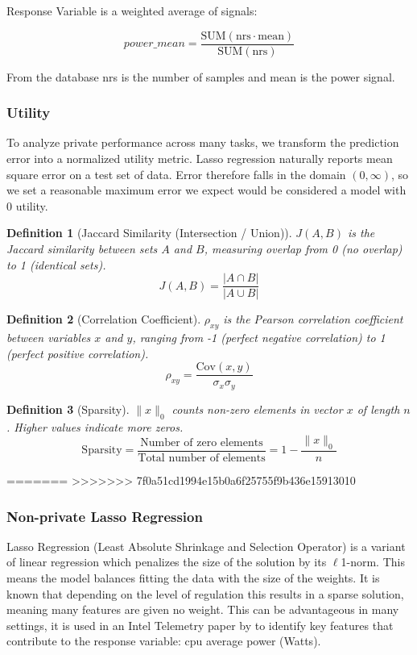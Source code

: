 \documentclass[12pt,letterpaper]{article}
\newtheorem{definition}{Definition}
\begin{document}
Response Variable is a weighted average of signals:

\[power\_mean = \frac{\text{SUM}(\text{nrs} \cdot \text{mean})}{\text{SUM}(\text{nrs})}\]

From the database nrs is the number of samples and mean is the power signal. 

\subsubsection{Utility}

To analyze private performance across many tasks, we transform the prediction error into a normalized utility metric. Lasso regression naturally reports mean square error on a test set of data. Error therefore falls in the domain $(0, \infty)$, so we set a reasonable maximum error we expect would be considered a model with 0 utility. 

\begin{definition}[Jaccard Similarity (Intersection / Union)]
    \label{def:sim}
    $J(A, B)$ is the Jaccard similarity between sets $A$ and $B$, measuring overlap from 0 (no overlap) to 1 (identical sets).
    \[J(A, B) = \frac{|A \cap B|}{|A \cup B|} \]
\end{definition}

\begin{definition}[Correlation Coefficient]
    \label{def:r2}
    $\rho_{xy}$ is the Pearson correlation coefficient between variables $x$ and $y$, ranging from -1 (perfect negative correlation) to 1 (perfect positive correlation).
    \[\rho_{xy} = \frac{\text{Cov}(x,y)}{\sigma_x \sigma_y}\]
\end{definition}

\begin{definition}[Sparsity]
    \label{def:sparsity}
    $\|x\|_0$ counts non-zero elements in vector $x$ of length $n$. Higher values indicate more zeros.
    \[\text{Sparsity} = \frac{\text{Number of zero elements}}{\text{Total number of elements}} = 1 - \frac{\|x\|_0}{n}\]
\end{definition}
=======
>>>>>>> 7f0a51cd1994e15b0a6f25755f9b436e15913010

\subsubsection{Non-private Lasso Regression}

Lasso Regression (Least Absolute Shrinkage and Selection Operator) is a variant of linear regression which penalizes the size of the solution by its $\ell$1-norm. This means the model balances fitting the data with the size of the weights. It is known that depending on the level of regulation this results in a sparse solution, meaning many features are given no weight. This can be advantageous in many settings, it is used in an Intel Telemetry paper by \cite{lassocarbon} to identify key features that contribute to the response variable: cpu average power (Watts). 
\end{document}
